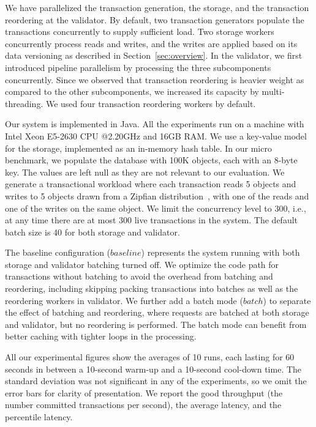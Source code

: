 We have parallelized the transaction generation, the storage, and the transaction reordering at the validator. By default, two transaction generators populate the transactions concurrently to supply sufficient load. Two storage workers concurrently process reads and writes, and the writes are applied based on its data versioning as described in Section~\ref{sec:overview}. In the validator, we first introduced pipeline parallelism by processing the three subcomponents concurrently. Since we observed that transaction reordering is heavier weight as compared to the other subcomponents, we increased its capacity by multi-threading. We used four transaction reordering workers by default.

Our system is implemented in Java. All the experiments run on a machine with
Intel Xeon E5-2630 CPU @2.20GHz and 16GB RAM. We use a key-value model for the
storage, implemented as an in-memory hash table. In our micro benchmark, we populate the database with 100K objects, each with an 8-byte key. The values are left null as they are not relevant to our evaluation. We generate a transactional workload where each transaction reads 5 objects and writes to 5 objects drawn from a Zipfian distribution~\cite{gray1994quickly}, with one of the reads and one of the writes on the same object. We limit the concurrency level to 300, i.e., at any time there are at most 300 live transactions in the system. The default batch size is 40 for both storage and validator.

The baseline configuration ($baseline$) represents the system running with both storage and validator batching turned off. We optimize the code path for transactions without batching to avoid the overhead from batching and reordering, including skipping packing transactions into batches as well as the reordering workers in validator. We further add a batch mode ($batch$) to separate the effect of batching and reordering, where requests are batched at both storage and validator, but no reordering is performed. The batch mode can benefit from better caching with tighter loops in the processing. 



All our experimental figures show the averages of 10 runs, each lasting for 60 seconds in between a 10-second warm-up and a 10-second cool-down time. The standard deviation was not significant in any of the experiments, so we omit the error bars for clarity of presentation. We report the good throughput (the number committed transactions per second), the average latency, and the percentile latency.


